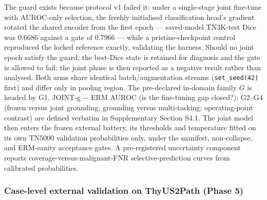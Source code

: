 \documentclass[jimh,article,submit,moreauthors,pdftex]{Definitions/tsp}
\begin{document}
The guard exists because protocol v1 failed it: under a single-stage
joint fine-tune with AUROC-only selection, the freshly initialised
classification head's gradient rotated the shared encoder from the
first epoch --- saved-model TN3K-test Dice was 0.6686 against a gate of
0.7966 --- while a pristine-checkpoint control reproduced the locked
reference exactly, validating the harness. Should no joint epoch
satisfy the guard, the best-Dice state is retained for diagnosis and
the gate is allowed to fail: the joint phase is then reported as a
negative result rather than analysed. Both arms share identical
batch/augmentation streams (\texttt{set\_seed(42)} first) and differ
only in pooling region. The pre-declared in-domain family $G$ is headed
by G1, JOINT-g $-$ ERM AUROC (is the fine-tuning gap closed?); G2--G4
(frozen versus joint grounding; grounding versus multi-tasking;
operating-point contrast) are defined verbatim in Supplementary Section
S4.1. The joint model then enters the frozen external battery, its
thresholds and temperature fitted on its own TN5000 validation
probabilities only, under the manifest, non-collapse, and ERM-sanity
acceptance gates. A pre-registered uncertainty component reports
coverage-versus-malignant-FNR selective-prediction curves from
calibrated probabilities.

\subsubsection{Case-level external validation on ThyUS2Path (Phase 5)}
\label{subsec:phase5_preregistered}
\end{document}
